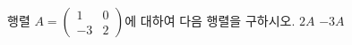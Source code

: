 \hspace*{2mm}\begin{minipage}[t]{\dimexpr\linewidth-2mm\relax}\vspace{0pt}
행렬 $A=\begin{pmatrix} 1 & 0 \\ -3 & 2 \end{pmatrix}$에 대하여 다음 행렬을 구하시오.
 $2A$
 $-3A$\end{minipage}
